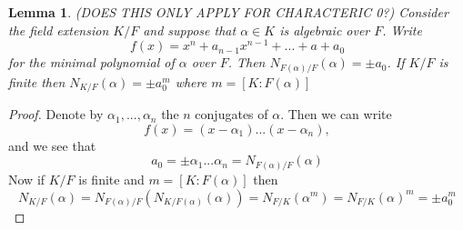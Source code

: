 \documentclass{article}
\newtheorem{lemma}{Lemma}[section]
\begin{document}
\begin{lemma}\label{lem: norm of algebraic number is pm 0th coefficient}
    (DOES THIS ONLY APPLY FOR CHARACTERIC 0?)
    Consider the field extension $K / F$ and suppose that $\alpha \in K$ is algebraic over $F$. Write 
    $$f(x) = x^n + a_{n-1} x^{n-1} + ... + a+a_0$$ 
    for the minimal polynomial of $\alpha$ over $F$. Then $N_{F(\alpha)/F} (\alpha) = \pm a_0$. If $K / F$ is finite then $N_{K / F}(\alpha) = \pm a_0^m$
    where $m = [K : F(\alpha)]$
\end{lemma}
\begin{proof}
    Denote by $\alpha_1, ..., \alpha_n$ the $n$ conjugates of $\alpha$. Then we can write
    $$f(x) = (x-\alpha_1)...(x-\alpha_n),$$
    and we see that
    $$a_0 = \pm \alpha_1 ... \alpha_n = N_{F(\alpha) / F}(\alpha)$$
    Now if $K/F$ is finite and $m = [K : F(\alpha)]$ then
    $$N_{K / F}(\alpha) = N_{F(\alpha) / F}(N_{K / F(\alpha)}(\alpha)) = N_{F / K}(\alpha^m) = N_{F / K}(\alpha)^m = \pm a_0^m$$
\end{proof}


\end{document}
